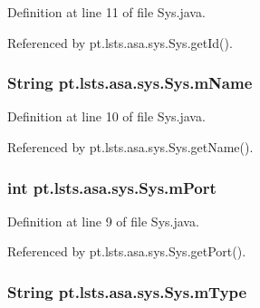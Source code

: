 Definition at line 11 of file Sys.\+java.



Referenced by pt.\+lsts.\+asa.\+sys.\+Sys.\+get\+Id().

\hypertarget{classpt_1_1lsts_1_1asa_1_1sys_1_1Sys_a027640f2299a0769350254ebe9ccb1bd}{}
\subsubsection[{m\+Name}]{\setlength{\rightskip}{0pt plus 5cm}String pt.\+lsts.\+asa.\+sys.\+Sys.\+m\+Name\hspace{0.3cm}{\ttfamily [private]}}\label{classpt_1_1lsts_1_1asa_1_1sys_1_1Sys_a027640f2299a0769350254ebe9ccb1bd}


Definition at line 10 of file Sys.\+java.



Referenced by pt.\+lsts.\+asa.\+sys.\+Sys.\+get\+Name().

\hypertarget{classpt_1_1lsts_1_1asa_1_1sys_1_1Sys_a35506036a8dbc58d09d0eea04e425698}{}
\subsubsection[{m\+Port}]{\setlength{\rightskip}{0pt plus 5cm}int pt.\+lsts.\+asa.\+sys.\+Sys.\+m\+Port\hspace{0.3cm}{\ttfamily [private]}}\label{classpt_1_1lsts_1_1asa_1_1sys_1_1Sys_a35506036a8dbc58d09d0eea04e425698}


Definition at line 9 of file Sys.\+java.



Referenced by pt.\+lsts.\+asa.\+sys.\+Sys.\+get\+Port().

\hypertarget{classpt_1_1lsts_1_1asa_1_1sys_1_1Sys_a3d26aacb60b4bcd95b5afdd8960206d3}{}
\subsubsection[{m\+Type}]{\setlength{\rightskip}{0pt plus 5cm}String pt.\+lsts.\+asa.\+sys.\+Sys.\+m\+Type\hspace{0.3cm}{\ttfamily [private]}}\label{classpt_1_1lsts_1_1asa_1_1sys_1_1Sys_a3d26aacb60b4bcd95b5afdd8960206d3}


